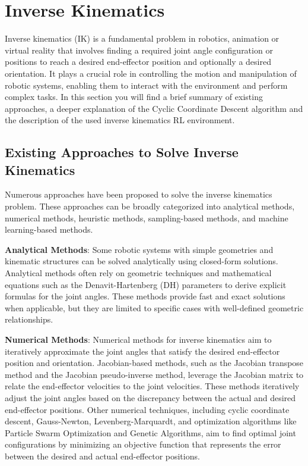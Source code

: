 \section{Inverse Kinematics}

Inverse kinematics (IK) is a fundamental problem in robotics, animation or virtual reality that involves finding a required joint angle configuration or positions to reach a desired end-effector position and optionally a desired orientation. It plays a crucial role in controlling the motion and manipulation of robotic systems, enabling them to interact with the environment and perform complex tasks. 
In this section you will find a brief summary of existing approaches, a deeper explanation of the Cyclic Coordinate Descent algorithm and the description of the used inverse kinematics RL environment.

\subsection{Existing Approaches to Solve Inverse Kinematics}

Numerous approaches have been proposed to solve the inverse kinematics problem. These approaches can be broadly categorized into analytical methods, numerical methods, heuristic methods, sampling-based methods, and machine learning-based methods.

\textbf{Analytical Methods}: Some robotic systems with simple geometries and kinematic structures can be solved analytically using closed-form solutions. Analytical methods often rely on geometric techniques and mathematical equations such as the Denavit-Hartenberg (DH) parameters to derive explicit formulas for the joint angles. These methods provide fast and exact solutions when applicable, but they are limited to specific cases with well-defined geometric relationships.

\textbf{Numerical Methods}: Numerical methods for inverse kinematics aim to iteratively approximate the joint angles that satisfy the desired end-effector position and orientation. Jacobian-based methods, such as the Jacobian transpose method and the Jacobian pseudo-inverse method, leverage the Jacobian matrix to relate the end-effector velocities to the joint velocities. These methods iteratively adjust the joint angles based on the discrepancy between the actual and desired end-effector positions. Other numerical techniques, including cyclic coordinate descent, Gauss-Newton, Levenberg-Marquardt, and optimization algorithms like Particle Swarm Optimization and Genetic Algorithms, aim to find optimal joint configurations by minimizing an objective function that represents the error between the desired and actual end-effector positions.

